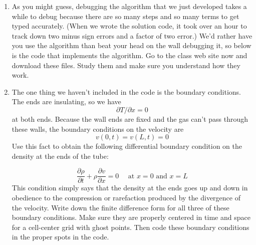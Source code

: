 \begin{problem}\label{P11.3}
\begin{enumerate}[label=(\alph*)]
	\item As you might guess, debugging the algorithm that we just developed takes a while to debug because there are so many steps and so many terms to get typed accurately. (When we wrote the solution code, it took over an hour to track down two minus sign errors and a factor of two error.) We\rq d rather have you use the algorithm than beat your head on the wall debugging it, so below is the code that implements the algorithm. Go to the class web site now and download these files. Study them and make sure you understand how they work.
	\item The one thing we haven\rq t included in the code is the boundary conditions. The ends are insulating, so we have
	\begin{equation}\label{eq:1128}
\partial T / \partial x=0
\end{equation}
at both ends. Because the wall ends are fixed and the gas can\rq t pass through these walls, the boundary conditions on the velocity are
\begin{equation}\label{eq:1129}
v(0, t)=v(L, t)=0
\end{equation}
Use this fact to obtain the following differential boundary condition
on the density at the ends of the tube:

\begin{equation}\label{eq:1130}
\frac{\partial \rho}{\partial t}+\rho \frac{\partial v}{\partial x}=0 \quad \text { at } x=0 \text { and } x=L
\end{equation}
This condition simply says that the density at the ends goes up and
down in obedience to the compression or rarefaction produced by the
divergence of the velocity.
Write down the finite difference form for all three of these boundary
conditions. Make sure they are properly centered in time and space
for a cell-center grid with ghost points. Then code these boundary
conditions in the proper spots in the code.

\end{enumerate}
\end{problem}
